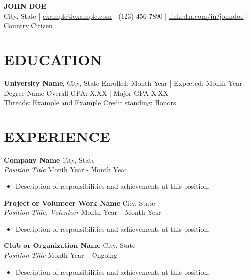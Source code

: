 \documentclass[a4paper,9pt]{extarticle}
\begin{document}
\pagestyle{empty}

\begin{center}
\textbf{\Large JOHN DOE}\\[2pt] %
City, State | \href{mailto:example@example.com}{example@example.com} | (123) 456-7890 | \href{https://www.linkedin.com/in/johndoe}{linkedin.com/in/johndoe} | Country Citizen %
\end{center}

\section*{EDUCATION}
\noindent
\textbf{University Name}, City, State \hfill Enrolled: Month Year | Expected: Month Year\\ %
Degree Name \hfill Overall GPA: X.XX | Major GPA X.XX\\ %
Threads: Example and Example \hfill Credit standing: Honors %

\section*{EXPERIENCE}
\noindent
\textbf{Company Name} \hfill City, State\\ %
\textit{Position Title} \hfill Month Year - Month Year %
\begin{itemize}
    \item Description of responsibilities and achievements at this position. %
\end{itemize}

\noindent
\textbf{Project or Volunteer Work Name} \hfill City, State\\ %
\textit{Position Title, Volunteer} \hfill Month Year – Month Year %
\begin{itemize}
    \item Description of responsibilities and achievements at this position. %
\end{itemize}

\textbf{Club or Organization Name} \hfill City, State\\ %
\textit{Position Title} \hfill Month Year – Ongoing %
\begin{itemize}
    \item Description of responsibilities and achievements at this position. %
\end{itemize}
\end{document}
